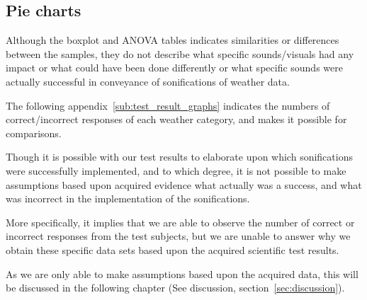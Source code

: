 

\FloatBarrier
\subsection{Pie charts} %
\label{sub:pie_charts}
Although the boxplot and ANOVA tables indicates similarities or differences between the samples, they do not describe what specific sounds/visuals had any impact or what could have been done differently or what specific sounds were actually successful in conveyance of sonifications of weather data.

The following appendix~\ref{sub:test_result_graphs} indicates the numbers of correct/incorrect responses of each weather category, and makes it possible for comparisons.

Though it is possible with our test results to elaborate upon which sonifications were successfully implemented, and to which degree, it is not possible to make assumptions based upon acquired evidence what actually was a success, and what was incorrect in the implementation of the sonifications.

More specifically, it implies that we are able to observe the number of correct or incorrect responses from the test subjects, but we are unable to answer why we obtain these specific data sets based upon the acquired scientific test results.

As we are only able to make assumptions based upon the acquired data, this will be discussed in the following chapter (See discussion, section~\ref{sec:discussion}).


